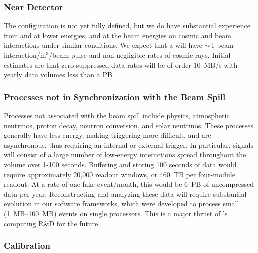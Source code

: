 \subsubsection{Near Detector} 

The  configuration is not yet fully defined,  but we do have substantial experience from  and   at lower energies, and   at the   beam energies on cosmic and beam interactions under similar conditions.  We expect that a  will have $\sim\,$1 beam interaction/m$^3$/beam pulse and non-negligible rates of cosmic rays. Initial estimates are that zero-suppressed data rates will be of order \SI{10}{MB/s} with yearly data volumes less than a PB.  

\subsubsection{Processes not in Synchronization with the Beam Spill} 

Processes not associated with the beam spill %
include  physics, atmospheric neutrinos, proton decay, neutron conversion, and solar neutrinos.  These processes generally have less energy, making triggering more difficult, and are  asynchronous, thus requiring an internal or external trigger.  In particular,  signals will consist of a large number of low-energy interactions spread throughout the  volume over 1-100 seconds. Buffering and storing 100 seconds of data would require approximately 20,000 readout windows, or \SI{460}{TB} per four-module  readout.  At a rate of one fake  event/month, this would be \SI{6}{PB} of uncompressed data per year.  Reconstructing and analyzing these data will require substantial evolution in our software frameworks, which were developed to process small (\SIrange{1}{100}{MB}) events on single processors. This is a major thrust of 's computing R\&D for the future. 

\subsubsection{
Calibration}

